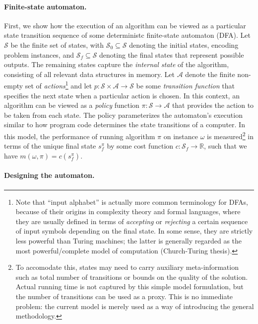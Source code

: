 \documentclass[a4paper]{report}
\theoremstyle{definition}
\theoremstyle{plain}
\begin{document}
\paragraph{Finite-state automaton.}
First, we show how the execution of an algorithm can be viewed as a particular
state transition sequence of some deterministc finite-state automaton (DFA). Let
$\mathcal{S}$ be the finite set of states, with
$\mathcal{S}_0 \subseteq \mathcal{S}$ denoting the initial states, encoding
problem instances, and $\mathcal{S}_f \subseteq \mathcal{S}$ denoting the final
states that represent possible outputs. The remaining states capture the
\emph{internal state} of the algorithm, consisting of all relevant data
structures in memory.
%
Let $\mathcal{A}$ denote the finite non-empty set of \emph{actions}\footnote{Note that
  ``input alphabet'' is actually more common terminology for DFAs, because of
  their origins in complexity theory and formal languages, where they are
  usually defined in terms of \emph{accepting} or \emph{rejecting} a certain sequence of input
  symbols depending on the final state. In some sense, they are strictly less
  powerful than Turing machines; the latter is generally regarded as the most
  powerful/complete model of computation (Church-Turing thesis).}
%
and let $p : \mathcal{S} \times \mathcal{A} \to \mathcal{S}$ be some
\emph{transition function} that specifies the next state when a particular
action is chosen.
%
In this context, an algorithm can be viewed as a \emph{policy} function
$\pi : \mathcal{S} \rightarrow \mathcal{A}$ that provides the action to be taken
from each state.
%
The policy parameterizes the automaton’s execution similar to how program code
determines the state transitions of a computer.
%
In this model, the performance of running algorithm $\pi$ on instance $\omega$ is
measured\footnote{To accomodate this, states may need to carry auxiliary
  meta-information such as total number of transitions or bounds on the quality
  of the solution. Actual running time is not captured by this simple model
  formulation, but the number of transitions can be used as a proxy. This is no
  immediate problem: the current model is merely used as a way of introducing
  the general methodology.} in terms of the unique final state $s_f^\pi$ by some
cost function $c : \mathcal{S}_f \rightarrow \mathbb{R}$, such that we have
$m(\omega,\pi) = c(s_f^\pi)$.

\paragraph{Designing the automaton.}
\end{document}
